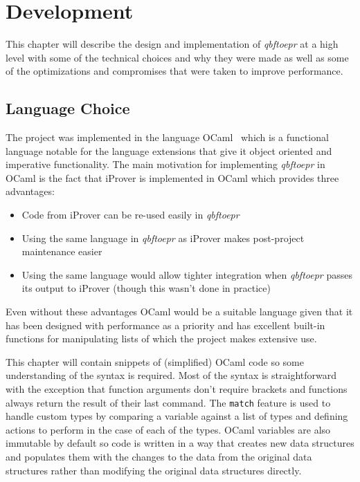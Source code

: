 \chapter{Development}
This chapter will describe the design and implementation of \textit{qbftoepr} at a high level with some of the technical choices and why they were made as well as some of the optimizations and compromises that were taken to improve performance.

\section{Language Choice}
The project was implemented in the language OCaml~\cite{ocaml} which is a functional language notable for the language extensions that give it object oriented and imperative functionality. The main motivation for implementing \textit{qbftoepr} in OCaml is the fact that iProver is implemented in OCaml which provides three advantages:

\begin{itemize}
\item Code from iProver can be re-used easily in \textit{qbftoepr}\\
\item Using the same language in \textit{qbftoepr} as iProver makes post-project maintenance easier\\
\item Using the same language would allow tighter integration when \textit{qbftoepr} passes its output to iProver (though this wasn't done in practice)\\
\end{itemize}

Even without these advantages OCaml would be a suitable language given that it has been designed with performance as a priority and has excellent built-in functions for manipulating lists of which the project makes extensive use.

This chapter will contain snippets of (simplified) OCaml code so some understanding of the syntax is required. Most of the syntax is straightforward with the exception that function arguments don't require brackets and functions always return the result of their last command. The \texttt{match} feature is used to handle custom types by comparing a variable against a list of types and defining actions to perform in the case of each of the types. OCaml variables are also immutable by default so code is written in a way that creates new data structures and populates them with the changes to the data from the original data structures rather than modifying the original data structures directly.

